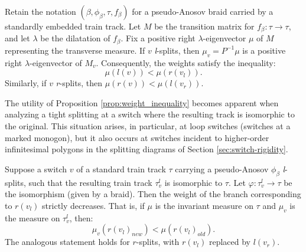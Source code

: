 \begin{prop}
\label{prop:weight_inequality}
Retain the notation $(\beta, \phi_\beta, \tau, f_\beta)$ for a pseudo-Anosov braid carried by a standardly embedded train track. Let $M$ be the transition matrix for $f_\beta \colon \tau \to \tau$, and let $\lambda$ be the dilatation of $f_\beta$. Fix a positive right $\lambda$-eigenvector $\mu$ of $M$ representing the transverse measure. If $v$ \textit{l}-splits, then $\mu_{v}=P^{-1}\mu$ is a positive right $\lambda$-eigenvector of $M_{v}$. Consequently, the weights satisfy the inequality:
\[
\mu(l(v)) < \mu(r(v_l)).
\]
Similarly, if $v$ \textit{r}-splits, then $\mu(r(v)) < \mu(l(v_r))$.
\end{prop}

The utility of Proposition \ref{prop:weight_inequality} becomes apparent when analyzing a tight splitting at a switch where the resulting track is isomorphic to the original. This situation arises, in particular, at loop switches (switches at a marked monogon), but it also occurs at switches incident to higher-order infinitesimal polygons in the splitting diagrams of Section \ref{sec:switch-rigidity}.

\begin{corollary}
\label{cor:weight_reduction}
    Suppose a switch $v$ of a standard train track $\tau$ carrying a pseudo-Anosov $\phi_\beta$ \textit{l}-splits, such that the resulting train track $\tau_v^l$ is isomorphic to $\tau$. Let $\varphi \colon \tau_v^l \to \tau$ be the isomorphism (given by a braid). Then the weight of the branch corresponding to $r(v_l)$ strictly decreases. That is, if $\mu$ is the invariant measure on $\tau$ and $\mu_v$ is the measure on $\tau_v^l$, then:
    \[
    \mu_v(r(v_l)_{new}) < \mu(r(v_l)_{old}).
    \]
    The analogous statement holds for $r$-splits, with $r(v_l)$ replaced by $l(v_r)$.
\end{corollary}

